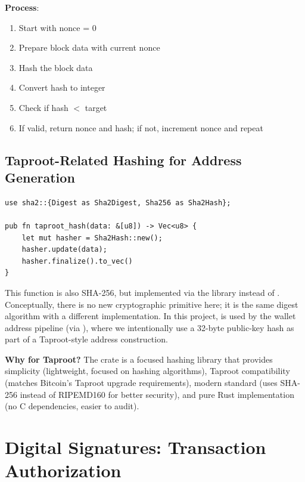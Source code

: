 \textbf{Process}:
\begin{enumerate}
  \item Start with nonce = 0
  \item Prepare block data with current nonce
  \item Hash the block data
  \item Convert hash to integer
  \item Check if hash $<$ target
  \item If valid, return nonce and hash; if not, increment nonce and repeat
\end{enumerate}

\subsection{Taproot-Related Hashing for Address Generation}
\label{sec:ch08-taproot-hash}

\begin{listing}[H]
\caption{Taproot-style SHA-256 hashing ()}
\label{lst:ch08-taproot-hash}
\begin{verbatim}
use sha2::{Digest as Sha2Digest, Sha256 as Sha2Hash};

pub fn taproot_hash(data: &[u8]) -> Vec<u8> {
    let mut hasher = Sha2Hash::new();
    hasher.update(data);
    hasher.finalize().to_vec()
}
\end{verbatim}
\end{listing}

This function is also SHA-256, but implemented via the  library instead of . Conceptually, there is no new cryptographic primitive here; it is the same digest algorithm with a different implementation. In this project,  is used by the wallet address pipeline (via  \textrightarrow{} ), where we intentionally use a 32-byte public-key hash as part of a Taproot-style address construction.

\textbf{Why  for Taproot?} The  crate is a focused hashing library that provides simplicity (lightweight, focused on hashing algorithms), Taproot compatibility (matches Bitcoin's Taproot upgrade requirements), modern standard (uses SHA-256 instead of RIPEMD160 for better security), and pure Rust implementation (no C dependencies, easier to audit).

\section{Digital Signatures: Transaction Authorization}
\label{sec:ch08-digital-signatures}

